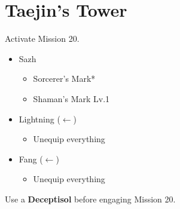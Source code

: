 \chapter{Taejin's Tower}

Activate Mission 20.

\begin{menu}
	\begin{itemize}
		\equip
		\begin{itemize}
			\item Sazh
				\begin{itemize}
					\item Sorcerer's Mark*
					\item Shaman's Mark Lv.1
				\end{itemize}
			\item Lightning ($\leftarrow$)
				\begin{itemize}
					\item Unequip everything
				\end{itemize}
			\item Fang ($\leftarrow$)
				\begin{itemize}
					\item Unequip everything
				\end{itemize}
		\end{itemize}
	\end{itemize}
\end{menu}

Use a \textbf{Deceptisol} before engaging Mission 20.

